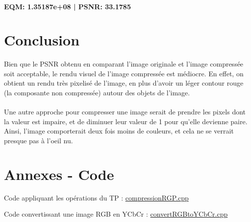\documentclass[a4paper,11pt]{article}
\begin{document}
\paragraph{} \textbf{EQM: 1.35187e+08 | PSNR: 33.1785}

\section{Conclusion}
\paragraph{} Bien que le PSNR obtenu en comparant l'image originale et l'image compressée soit acceptable, le rendu visuel de l'image compressée est médiocre. En effet, on obtient un rendu très pixelisé de l'image, en plus d'avoir un léger contour rouge (la composante non compressée) autour des objets de l'image.

\paragraph{} Une autre approche pour compresser une image serait de prendre les pixels dont la valeur est impaire, et de diminuer leur valeur de 1 pour qu'elle devienne paire. Ainsi, l'image comporterait deux fois moins de couleurs, et cela ne se verrait presque pas à l'oeil nu.

\section*{Annexes - Code}

Code appliquant les opérations du TP : \href{https://github.com/Ooya/M2-IMAGINA/blob/master/Compression/TP1/compressionRGB.cpp}{compressionRGP.cpp}

Code convertissant une image RGB en YCbCr : \href{https://github.com/Ooya/M2-IMAGINA/blob/master/Compression/TP1/convRGBtoYCbCr.cpp}{convertRGBtoYCbCr.cpp}
\end{document}
